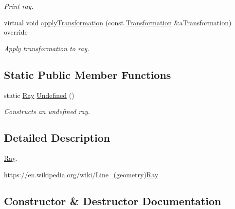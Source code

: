 \begin{DoxyCompactItemize}
\begin{DoxyCompactList}\small\item\em Print ray. \end{DoxyCompactList}\item 
virtual void \hyperlink{classostk_1_1math_1_1geom_1_1d3_1_1objects_1_1_ray_abdbc52aa6745f9d9601a8138a519d828}{apply\+Transformation} (const \hyperlink{classostk_1_1math_1_1geom_1_1d3_1_1_transformation}{Transformation} \&a\+Transformation) override
\begin{DoxyCompactList}\small\item\em Apply transformation to ray. \end{DoxyCompactList}\end{DoxyCompactItemize}
\subsection*{Static Public Member Functions}
\begin{DoxyCompactItemize}
\item 
static \hyperlink{classostk_1_1math_1_1geom_1_1d3_1_1objects_1_1_ray}{Ray} \hyperlink{classostk_1_1math_1_1geom_1_1d3_1_1objects_1_1_ray_a858510b6478f7cb47b763df6c641dfa7}{Undefined} ()
\begin{DoxyCompactList}\small\item\em Constructs an undefined ray. \end{DoxyCompactList}\end{DoxyCompactItemize}


\subsection{Detailed Description}
\hyperlink{classostk_1_1math_1_1geom_1_1d3_1_1objects_1_1_ray}{Ray}. 

https\+://en.wikipedia.\+org/wiki/\+Line\+\_\+(geometry)\hyperlink{classostk_1_1math_1_1geom_1_1d3_1_1objects_1_1_ray_a78335698f8a4f72e613e607b13121df0}{Ray} 

\subsection{Constructor \& Destructor Documentation}
\mbox{\label{classostk_1_1math_1_1geom_1_1d3_1_1objects_1_1_ray_a78335698f8a4f72e613e607b13121df0}} 
